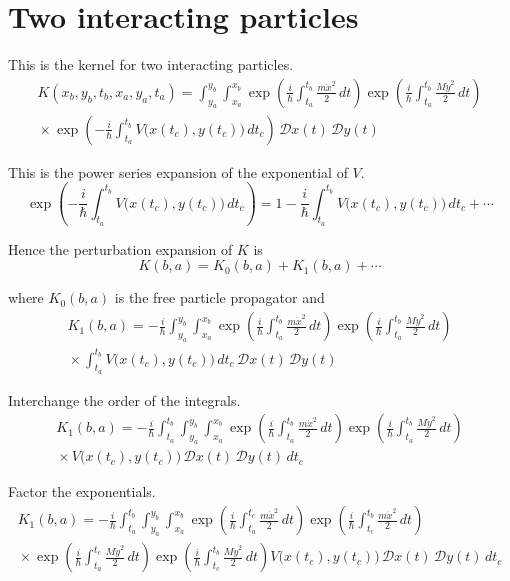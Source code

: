 

\section*{Two interacting particles}

This is the kernel for two interacting particles.
\begin{multline*}
K(x_b,y_b,t_b,x_a,y_a,t_a)=\int_{y_a}^{y_b}\int_{x_a}^{x_b}
\exp\left(\frac{i}{\hbar}\int_{t_a}^{t_b}\frac{m\dot x^2}{2}\,dt\right)
\exp\left(\frac{i}{\hbar}\int_{t_a}^{t_b}\frac{M\dot y^2}{2}\,dt\right)
\\
{}\times
\exp\left(-\frac{i}{\hbar}\int_{t_a}^{t_b}V\bigl(x(t_c),y(t_c)\bigr)\,dt_c\right)
\,\mathscr Dx(t)\,\mathscr Dy(t)
\end{multline*}

This is the power series expansion of the exponential of $V$.
\begin{equation*}
\exp\left(-\frac{i}{\hbar}\int_{t_a}^{t_b}V\bigl(x(t_c),y(t_c)\bigr)\,dt_c\right)
=1-\frac{i}{\hbar}\int_{t_a}^{t_b}V\bigl(x(t_c),y(t_c)\bigr)\,dt_c+{}\cdots
\end{equation*}

Hence the perturbation expansion of $K$ is
\begin{equation*}
K(b,a)=K_0(b,a)+K_1(b,a)+{}\cdots
\end{equation*}

where $K_0(b,a)$ is the free particle propagator and
\begin{multline*}
K_1(b,a)=-\frac{i}{\hbar}\int_{y_a}^{y_b}\int_{x_a}^{x_b}
\exp\left(\frac{i}{\hbar}\int_{t_a}^{t_b}\frac{m\dot x^2}{2}\,dt\right)
\exp\left(\frac{i}{\hbar}\int_{t_a}^{t_b}\frac{M\dot y^2}{2}\,dt\right)
\\
{}\times\int_{t_a}^{t_b}V\bigl(x(t_c),y(t_c)\bigr)
\,dt_c\,\mathscr Dx(t)\,\mathscr Dy(t)
\end{multline*}

Interchange the order of the integrals.
\begin{multline*}
K_1(b,a)=-\frac{i}{\hbar}\int_{t_a}^{t_b}\int_{y_a}^{y_b}\int_{x_a}^{x_b}
\exp\left(\frac{i}{\hbar}\int_{t_a}^{t_b}\frac{m\dot x^2}{2}\,dt\right)
\exp\left(\frac{i}{\hbar}\int_{t_a}^{t_b}\frac{M\dot y^2}{2}\,dt\right)
\\
{}\times V\bigl(x(t_c),y(t_c)\bigr)
\,\mathscr Dx(t)\,\mathscr Dy(t)\,dt_c
\end{multline*}

Factor the exponentials.
\begin{multline*}
K_1(b,a)=-\frac{i}{\hbar}\int_{t_a}^{t_b}\int_{y_a}^{y_b}\int_{x_a}^{x_b}
\exp\left(\frac{i}{\hbar}\int_{t_a}^{t_c}\frac{m\dot x^2}{2}\,dt\right)
\exp\left(\frac{i}{\hbar}\int_{t_c}^{t_b}\frac{m\dot x^2}{2}\,dt\right)
\\
{}\times
\exp\left(\frac{i}{\hbar}\int_{t_a}^{t_c}\frac{M\dot y^2}{2}\,dt\right)
\exp\left(\frac{i}{\hbar}\int_{t_c}^{t_b}\frac{M\dot y^2}{2}\,dt\right)
V\bigl(x(t_c),y(t_c)\bigr)
\,\mathscr Dx(t)\,\mathscr Dy(t)\,dt_c
\end{multline*}

